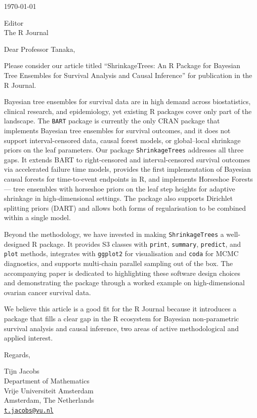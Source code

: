 \documentclass[
  12pt,
]{article}
\author{}
\date{\vspace{-2.5em}}
\begin{document}
\thispagestyle{empty}

\today

Editor\\
The R Journal\\
\bigskip

Dear Professor Tanaka, \bigskip

Please consider our article titled ``ShrinkageTrees: An R Package for
Bayesian Tree Ensembles for Survival Analysis and Causal Inference'' for
publication in the R Journal.

Bayesian tree ensembles for survival data are in high demand across
biostatistics, clinical research, and epidemiology, yet existing R
packages cover only part of the landscape. The \texttt{BART} package is
currently the only CRAN package that implements Bayesian tree ensembles
for survival outcomes, and it does not support interval-censored data,
causal forest models, or global--local shrinkage priors on the leaf
parameters. Our package \texttt{ShrinkageTrees} addresses all three
gaps. It extends BART to right-censored and interval-censored survival
outcomes via accelerated failure time models, provides the first
implementation of Bayesian causal forests for time-to-event endpoints in
R, and implements Horseshoe Forests --- tree ensembles with horseshoe
priors on the leaf step heights for adaptive shrinkage in
high-dimensional settings. The package also supports Dirichlet splitting
priors (DART) and allows both forms of regularisation to be combined
within a single model.

Beyond the methodology, we have invested in making
\texttt{ShrinkageTrees} a well-designed R package. It provides S3
classes with \texttt{print}, \texttt{summary}, \texttt{predict}, and
\texttt{plot} methods, integrates with \texttt{ggplot2} for
visualisation and \texttt{coda} for MCMC diagnostics, and supports
multi-chain parallel sampling out of the box. The accompanying paper is
dedicated to highlighting these software design choices and
demonstrating the package through a worked example on high-dimensional
ovarian cancer survival data.

We believe this article is a good fit for the R Journal because it
introduces a package that fills a clear gap in the R ecosystem for
Bayesian non-parametric survival analysis and causal inference, two
areas of active methodological and applied interest.

\bigskip
\bigskip

Regards,

Tijn Jacobs\\
Department of Mathematics\\
Vrije Universiteit Amsterdam\\
Amsterdam, The Netherlands\\
\href{mailto:t.jacobs@vu.nl}{\nolinkurl{t.jacobs@vu.nl}}

\bigskip
\end{document}

